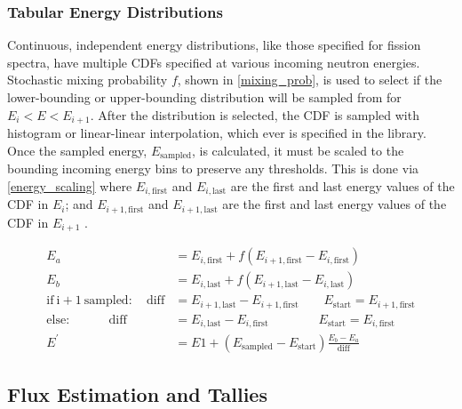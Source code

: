\subsubsection{Tabular Energy Distributions}

Continuous, independent energy distributions, like those specified for fission spectra, have multiple CDFs specified at various incoming neutron energies.  Stochastic mixing probability $f$, shown in \eqref{mixing_prob}, is used to select if the lower-bounding or upper-bounding distribution will be sampled from for $E_i < E < E_{i+1}$.  After the distribution is selected, the CDF is sampled with histogram or linear-linear interpolation, which ever is specified in the library.  Once the sampled energy, $E_\mathrm{sampled}$, is calculated, it must be scaled to the bounding incoming energy bins to preserve any thresholds.  This is done via \eqref{energy_scaling} where $E_{i,\mathrm{first}}$ and $E_{i,\mathrm{last}}$ are the first and last energy values of the CDF in $E_i$; and $E_{i+1,\mathrm{first}}$ and $E_{i+1,\mathrm{last}}$ are the first and last energy values of the CDF in $E_{i+1}$ \cite{mcnp}.

\begin{equation}
\label{energy_scaling}
\begin{split}
E_a &= E_{i,\mathrm{first}} +  f( E_{i+1,\mathrm{first}} - E_{i,\mathrm{first}} ) \\
E_b &= E_{i,\mathrm{last}} +  f( E_{i+1,\mathrm{last}} - E_{i,\mathrm{last}} ) \\
\mathrm{if\:i+1\:sampled:} \quad \mathrm{diff} &= E_{i+1,\mathrm{last}}  - E_{i+1,\mathrm{first}}  \qquad E_\mathrm{start}= E_{i+1,\mathrm{first}}  \\
\mathrm{else:}          \qquad \quad       \mathrm{diff} &= E_{i,\mathrm{last}}  - E_{i,\mathrm{first}}  \qquad \qquad E_\mathrm{start}= E_{i,\mathrm{first}}  \\
E^\prime &=  E1  +  ( E_\mathrm{sampled} - E_\mathrm{start})  \frac{ E_b - E_a}{ \mathrm{diff} }  
\end{split}
\end{equation}


\subsection{Flux Estimation and Tallies}

